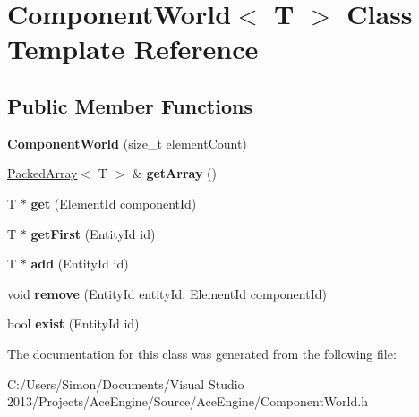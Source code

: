 \hypertarget{class_component_world}{}\section{Component\+World$<$ T $>$ Class Template Reference}
\label{class_component_world}
\subsection*{Public Member Functions}
\begin{DoxyCompactItemize}
\item 
\hypertarget{class_component_world_a156ba0ac393da228f164287ce911fffc}{}{\bfseries Component\+World} (size\+\_\+t element\+Count)\label{class_component_world_a156ba0ac393da228f164287ce911fffc}

\item 
\hypertarget{class_component_world_a75233dcb97d315d4e06a0f767b70f3a1}{}\hyperlink{class_packed_array}{Packed\+Array}$<$ T $>$ \& {\bfseries get\+Array} ()\label{class_component_world_a75233dcb97d315d4e06a0f767b70f3a1}

\item 
\hypertarget{class_component_world_a50bb6dc0183362e0748a66abbe21410e}{}T $\ast$ {\bfseries get} (Element\+Id component\+Id)\label{class_component_world_a50bb6dc0183362e0748a66abbe21410e}

\item 
\hypertarget{class_component_world_a02a565a807f1625be89091f15e906105}{}T $\ast$ {\bfseries get\+First} (Entity\+Id id)\label{class_component_world_a02a565a807f1625be89091f15e906105}

\item 
\hypertarget{class_component_world_aba738be57cef4cf6c6791019f3a318a7}{}T $\ast$ {\bfseries add} (Entity\+Id id)\label{class_component_world_aba738be57cef4cf6c6791019f3a318a7}

\item 
\hypertarget{class_component_world_aa3b8a211c00d83f93e20780f036b8260}{}void {\bfseries remove} (Entity\+Id entity\+Id, Element\+Id component\+Id)\label{class_component_world_aa3b8a211c00d83f93e20780f036b8260}

\item 
\hypertarget{class_component_world_ae8a8cb1587089ff2454cdcb010fc3d8d}{}bool {\bfseries exist} (Entity\+Id id)\label{class_component_world_ae8a8cb1587089ff2454cdcb010fc3d8d}

\end{DoxyCompactItemize}


The documentation for this class was generated from the following file\+:\begin{DoxyCompactItemize}
\item 
C\+:/\+Users/\+Simon/\+Documents/\+Visual Studio 2013/\+Projects/\+Ace\+Engine/\+Source/\+Ace\+Engine/Component\+World.\+h\end{DoxyCompactItemize}
